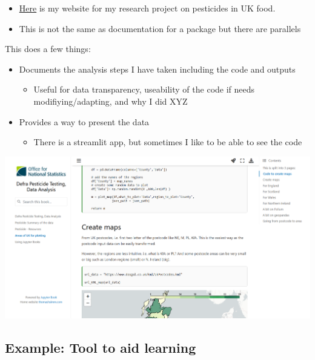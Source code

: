 \documentclass[
  letterpaper,
  DIV=11,
  numbers=noendperiod]{scrartcl}
\providecommand{\tightlist}{%
  \setlength{\itemsep}{0pt}\setlength{\parskip}{0pt}}\usepackage{longtable,booktabs,array}
\begin{document}
\begin{itemize}
\item
  \href{https://thomashsimm.github.io/PesticideDocs/UK_areas.html}{Here}
  is my website for my research project on pesticides in UK food.
\item
  This is not the same as documentation for a package but there are
  parallels
\end{itemize}

This does a few things:

\begin{itemize}
\tightlist
\item
  Documents the analysis steps I have taken including the code and
  outputs

  \begin{itemize}
  \tightlist
  \item
    Useful for data transparency, useability of the code if needs
    modifiying/adapting, and why I did XYZ
  \end{itemize}
\item
  Provides a way to present the data

  \begin{itemize}
  \tightlist
  \item
    There is a streamlit app, but sometimes I like to be able to see the
    code
  \end{itemize}
\end{itemize}

\includegraphics{ghtop_images/pest.png}

\hypertarget{example-tool-to-aid-learning}{%
\subsection{Example: Tool to aid
learning}\label{example-tool-to-aid-learning}}
\end{document}
